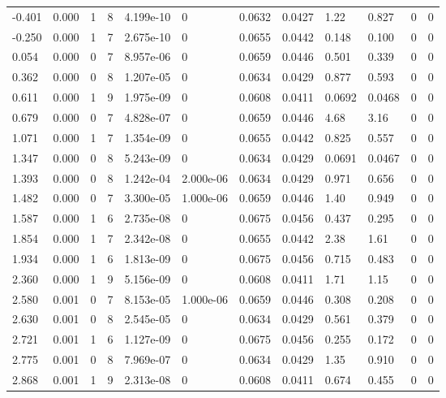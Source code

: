 \documentclass[preview]{standalone}
\begin{document}
{{\begin{tabular}{L{1.2cm}C{1.2cm} C{0.3cm}C{0.5cm} C{1.4cm}C{1.4cm} C{1.4cm}C{1.4cm} C{1.6cm}C{1.6cm} C{1.6cm}C{1.6cm}}
  -0.401  &  0.000  & 1     &  8 &  4.199e-10  & 0  &  0.0632&   0.0427& 1.22 & 0.827   &  0 & 0  \\ 
  -0.250  &  0.000  & 1     &  7 &  2.675e-10  & 0  &  0.0655&   0.0442& 0.148 & 0.100   &  0 & 0  \\ 
  0.054  &  0.000  & 0     &  7 &  8.957e-06  & 0  &  0.0659&   0.0446& 0.501 & 0.339   &  0 & 0  \\ 
  0.362  &  0.000  & 0     &  8 &  1.207e-05  & 0  &  0.0634&   0.0429& 0.877 & 0.593   &  0 & 0  \\ 
  0.611  &  0.000  & 1     &  9 &  1.975e-09  & 0  &  0.0608&   0.0411& 0.0692 & 0.0468   &  0 & 0  \\ 
  0.679  &  0.000  & 0     &  7 &  4.828e-07  & 0  &  0.0659&   0.0446& 4.68 & 3.16   &  0 & 0  \\ 
  1.071  &  0.000  & 1     &  7 &  1.354e-09  & 0  &  0.0655&   0.0442& 0.825 & 0.557   &  0 & 0  \\ 
  1.347  &  0.000  & 0     &  8 &  5.243e-09  & 0  &  0.0634&   0.0429& 0.0691 & 0.0467   &  0 & 0  \\ 
  1.393  &  0.000  & 0     &  8 &  1.242e-04  & 2.000e-06  &  0.0634&   0.0429& 0.971 & 0.656   &  0 & 0  \\ 
  1.482  &  0.000  & 0     &  7 &  3.300e-05  & 1.000e-06  &  0.0659&   0.0446& 1.40 & 0.949   &  0 & 0  \\ 
  1.587  &  0.000  & 1     &  6 &  2.735e-08  & 0  &  0.0675&   0.0456& 0.437 & 0.295   &  0 & 0  \\ 
  1.854  &  0.000  & 1     &  7 &  2.342e-08  & 0  &  0.0655&   0.0442& 2.38 & 1.61   &  0 & 0  \\ 
  1.934  &  0.000  & 1     &  6 &  1.813e-09  & 0  &  0.0675&   0.0456& 0.715 & 0.483   &  0 & 0  \\ 
  2.360  &  0.000  & 1     &  9 &  5.156e-09  & 0  &  0.0608&   0.0411& 1.71 & 1.15   &  0 & 0  \\ 
  2.580  &  0.001  & 0     &  7 &  8.153e-05  & 1.000e-06  &  0.0659&   0.0446& 0.308 & 0.208   &  0 & 0  \\ 
  2.630  &  0.001  & 0     &  8 &  2.545e-05  & 0  &  0.0634&   0.0429& 0.561 & 0.379   &  0 & 0  \\ 
  2.721  &  0.001  & 1     &  6 &  1.127e-09  & 0  &  0.0675&   0.0456& 0.255 & 0.172   &  0 & 0  \\ 
  2.775  &  0.001  & 0     &  8 &  7.969e-07  & 0  &  0.0634&   0.0429& 1.35 & 0.910   &  0 & 0  \\ 
  2.868  &  0.001  & 1     &  9 &  2.313e-08  & 0  &  0.0608&   0.0411& 0.674 & 0.455   &  0 & 0  \\ 

\end{tabular}}}
\end{document}
